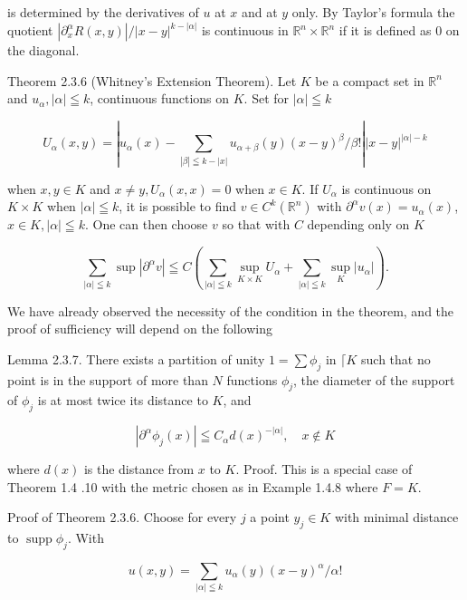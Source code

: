 is determined by the derivatives of $u$ at $x$ and at $y$ only. By Taylor's formula the quotient $\left|\partial_{x}^{\alpha} R(x, y)\right| /|x-y|^{k-|\alpha|}$ is continuous in $\mathbb{R}^{n} \times \mathbb{R}^{n}$ if it is defined as 0 on the diagonal.

Theorem 2.3.6 (Whitney's Extension Theorem). Let $K$ be a compact set in $\mathbb{R}^{n}$ and $u_{\alpha},|\alpha| \leqq k$, continuous functions on $K$. Set for $|\alpha| \leqq k$

\[
U_{\alpha}(x, y)=\left|u_{\alpha}(x)-\sum_{|\beta| \leqq k-|x|} u_{\alpha+\beta}(y)(x-y)^{\beta} / \beta !\right||x-y|^{|\alpha|-k}
\]

when $x, y \in K$ and $x \neq y, U_{\alpha}(x, x)=0$ when $x \in K$. If $U_{\alpha}$ is continuous on $K \times K$ when $|\alpha| \leqq k$, it is possible to find $v \in C^{k}\left(\mathbb{R}^{n}\right)$ with $\partial^{\alpha} v(x)=u_{\alpha}(x)$, $x \in K,|\alpha| \leqq k$. One can then choose $v$ so that with $C$ depending only on $K$


\begin{equation*}
\sum_{|\alpha| \leqq k} \sup \left|\partial^{\alpha} v\right| \leqq C\left(\sum_{|\alpha| \leqq k} \sup _{K \times K} U_{\alpha}+\sum_{|\alpha| \leqq k} \sup _{K}\left|u_{\alpha}\right|\right) . \tag{2.3.8}
\end{equation*}


We have already observed the necessity of the condition in the theorem, and the proof of sufficiency will depend on the following

Lemma 2.3.7. There exists a partition of unity $1=\sum \phi_{j}$ in $\lceil K$ such that no point is in the support of more than $N$ functions $\phi_{j}$, the diameter of the support of $\phi_{j}$ is at most twice its distance to $K$, and


\begin{equation*}
\left|\partial^{\alpha} \phi_{j}(x)\right| \leqq C_{\alpha} d(x)^{-|\alpha|}, \quad x \notin K \tag{2.3.9}
\end{equation*}


where $d(x)$ is the distance from $x$ to $K$.
Proof. This is a special case of Theorem 1.4 .10 with the metric chosen as in Example 1.4.8 where $F=K$.

Proof of Theorem 2.3.6. Choose for every $j$ a point $y_{j} \in K$ with minimal distance to $\operatorname{supp} \phi_{j}$. With

\[
u(x, y)=\sum_{|\alpha| \leqq k} u_{\alpha}(y)(x-y)^{\alpha} / \alpha !
\]

